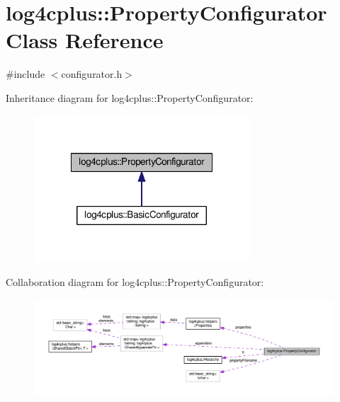 \hypertarget{classlog4cplus_1_1PropertyConfigurator}{\section{log4cplus\-:\-:Property\-Configurator Class Reference}
\label{classlog4cplus_1_1PropertyConfigurator}
}


{\ttfamily \#include $<$configurator.\-h$>$}



Inheritance diagram for log4cplus\-:\-:Property\-Configurator\-:
\nopagebreak
\begin{figure}[H]
\begin{center}
\leavevmode
\includegraphics[width=228pt]{classlog4cplus_1_1PropertyConfigurator__inherit__graph}
\end{center}
\end{figure}


Collaboration diagram for log4cplus\-:\-:Property\-Configurator\-:
\nopagebreak
\begin{figure}[H]
\begin{center}
\leavevmode
\includegraphics[width=350pt]{classlog4cplus_1_1PropertyConfigurator__coll__graph}
\end{center}
\end{figure}
